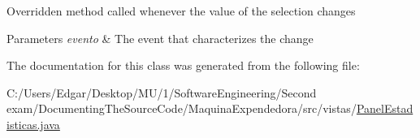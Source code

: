 Overridden method called whenever the value of the selection changes 
\begin{DoxyParams}{Parameters}
{\em evento} & The event that characterizes the change \\
\hline
\end{DoxyParams}


The documentation for this class was generated from the following file\+:\begin{DoxyCompactItemize}
\item 
C\+:/\+Users/\+Edgar/\+Desktop/\+M\+U/1/\+Software\+Engineering/\+Second exam/\+Documenting\+The\+Source\+Code/\+Maquina\+Expendedora/src/vistas/\mbox{\hyperlink{_panel_estadisticas_8java}{Panel\+Estadisticas.\+java}}\end{DoxyCompactItemize}
